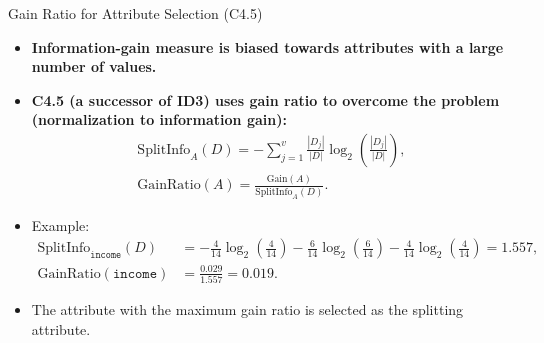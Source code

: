 \begin{frame}{Gain Ratio for Attribute Selection (C4.5)}
	\begin{itemize}
		\item \textbf{Information-gain measure is biased towards attributes with a large number of values.}
		\item \textbf{C4.5 (a successor of ID3) uses gain ratio to overcome the problem (normalization to information gain):}
		      \begin{align}
			      \text{SplitInfo}_A(D) = - \sum_{j=1}^{v} \frac{|D_j|}{|D|} \log_2\left( \frac{|D_j|}{|D|} \right), \\
			      \text{GainRatio}(A) = \frac{\text{Gain}(A)}{\text{SplitInfo}_A(D)}.
		      \end{align}
		\item Example:
		      \begin{align}
			      \text{SplitInfo}_{\texttt{income}}(D) & = -\frac{4}{14} \log_2 \left( \frac{4}{14} \right) - \frac{6}{14} \log_2 \left( \frac{6}{14} \right) - \frac{4}{14} \log_2 \left( \frac{4}{14} \right) = 1.557, \\
			      \text{GainRatio}(\texttt{income})     & = \frac{0.029}{1.557} = 0.019.
		      \end{align}
		\item The attribute with the maximum gain ratio is selected as the splitting attribute.
	\end{itemize}
\end{frame}

